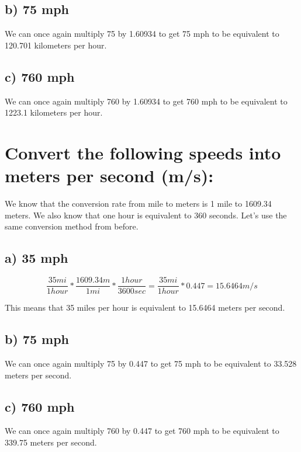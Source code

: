\documentclass[]{article}
\begin{document}
\subsection{b) 75 mph}\label{b-75-mph}

We can once again multiply 75 by 1.60934 to get 75 mph to be equivalent
to 120.701 kilometers per hour.

\subsection{c) 760 mph}\label{c-760-mph}

We can once again multiply 760 by 1.60934 to get 760 mph to be
equivalent to 1223.1 kilometers per hour.

\section{Convert the following speeds into meters per second
(m/s):}\label{convert-the-following-speeds-into-meters-per-second-ms}

We know that the conversion rate from mile to meters is 1 mile to
1609.34 meters. We also know that one hour is equivalent to 360 seconds.
Let's use the same conversion method from before.

\subsection{a) 35 mph}\label{a-35-mph-1}

\[\frac{35 mi}{1 hour} * \frac{1609.34 m}{1 mi} * \frac{1 hour}{3600 sec} = \frac{35 mi}{1 hour} * 0.447 = 15.6464 m/s\]

This means that 35 miles per hour is equivalent to 15.6464 meters per
second.

\subsection{b) 75 mph}\label{b-75-mph-1}

We can once again multiply 75 by 0.447 to get 75 mph to be equivalent to
33.528 meters per second.

\subsection{c) 760 mph}\label{c-760-mph-1}

We can once again multiply 760 by 0.447 to get 760 mph to be equivalent
to 339.75 meters per second.
\end{document}
